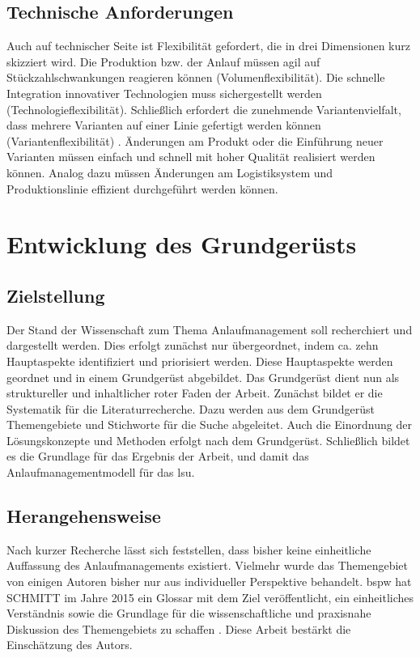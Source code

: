\subsection*{Technische Anforderungen}

Auch auf technischer Seite ist Flexibilität gefordert, die in drei Dimensionen kurz skizziert wird. 
Die Produktion bzw. der Anlauf müssen agil auf Stückzahlschwankungen reagieren können (Volumenflexibilität). Die schnelle Integration innovativer Technologien muss sichergestellt werden (Technologieflexibilität). Schließlich erfordert die zunehmende Variantenvielfalt, dass mehrere Varianten auf einer Linie gefertigt werden können (Variantenflexibilität) \autocite[22]{Scholz2010}.
Änderungen am Produkt oder die Einführung neuer Varianten müssen einfach und schnell mit hoher Qualität realisiert werden können. Analog dazu müssen Änderungen am Logistiksystem und Produktionslinie effizient durchgeführt werden können.  

\section{Entwicklung des Grundgerüsts}\label{sec:grundgeruest}
\subsection*{Zielstellung}

Der Stand der Wissenschaft zum Thema Anlaufmanagement soll recherchiert und dargestellt werden. Dies erfolgt zunächst nur übergeordnet, indem ca. zehn Hauptaspekte identifiziert und priorisiert werden. Diese Hauptaspekte werden geordnet und in einem Grundgerüst abgebildet. Das Grundgerüst dient nun als struktureller und inhaltlicher roter Faden der Arbeit. 
Zunächst bildet er die Systematik für die Literaturrecherche. Dazu werden aus dem Grundgerüst Themengebiete und Stichworte für die Suche abgeleitet. 
Auch die Einordnung der Lösungskonzepte und Methoden erfolgt nach dem Grundgerüst. 
Schließlich bildet es die Grundlage für das Ergebnis der Arbeit, und damit das Anlaufmanagementmodell für das \gls{lsu}. 

\subsection*{Herangehensweise}\label{sec:herangehensweise_gg}

Nach kurzer Recherche lässt sich feststellen, dass bisher keine einheitliche Auffassung des Anlaufmanagements existiert. Vielmehr wurde das Themengebiet von einigen Autoren bisher nur aus individueller Perspektive behandelt. 
\Gls{bspw} hat SCHMITT im Jahre 2015 ein Glossar mit dem Ziel veröffentlicht, ein einheitliches Verständnis sowie die Grundlage für die wissenschaftliche und praxisnahe Diskussion des Themengebiets zu schaffen \autocite{Schmitt2015}. Diese Arbeit bestärkt die Einschätzung des Autors. 

